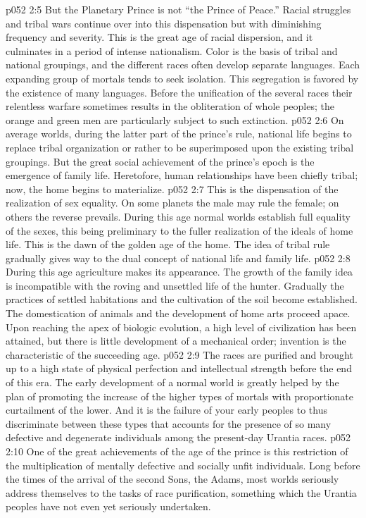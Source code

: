 \pc \vs p052 2:5 But the Planetary Prince is not “the Prince of Peace.” Racial struggles and tribal wars continue over into this dispensation but with diminishing frequency and severity. This is the great age of racial dispersion, and it culminates in a period of intense nationalism. Color is the basis of tribal and national groupings, and the different races often develop separate languages. Each expanding group of mortals tends to seek isolation. This segregation is favored by the existence of many languages. Before the unification of the several races their relentless warfare sometimes results in the obliteration of whole peoples; the orange and green men are particularly subject to such extinction.
\vs p052 2:6 On average worlds, during the latter part of the prince’s rule, national life begins to replace tribal organization or rather to be superimposed upon the existing tribal groupings. But the great social achievement of the prince’s epoch is the emergence of family life. Heretofore, human relationships have been chiefly tribal; now, the home begins to materialize.
\vs p052 2:7 This is the dispensation of the realization of sex equality. On some planets the male may rule the female; on others the reverse prevails. During this age normal worlds establish full equality of the sexes, this being preliminary to the fuller realization of the ideals of home life. This is the dawn of the golden age of the home. The idea of tribal rule gradually gives way to the dual concept of national life and family life.
\vs p052 2:8 During this age agriculture makes its appearance. The growth of the family idea is incompatible with the roving and unsettled life of the hunter. Gradually the practices of settled habitations and the cultivation of the soil become established. The domestication of animals and the development of home arts proceed apace. Upon reaching the apex of biologic evolution, a high level of civilization has been attained, but there is little development of a mechanical order; invention is the characteristic of the succeeding age.
\pc \vs p052 2:9 The races are purified and brought up to a high state of physical perfection and intellectual strength before the end of this era. The early development of a normal world is greatly helped by the plan of promoting the increase of the higher types of mortals with proportionate curtailment of the lower. And it is the failure of your early peoples to thus discriminate between these types that accounts for the presence of so many defective and degenerate individuals among the present\hyp{}day Urantia races.
\vs p052 2:10 One of the great achievements of the age of the prince is this restriction of the multiplication of mentally defective and socially unfit individuals. Long before the times of the arrival of the second Sons, the Adams, most worlds seriously address themselves to the tasks of race purification, something which the Urantia peoples have not even yet seriously undertaken.
